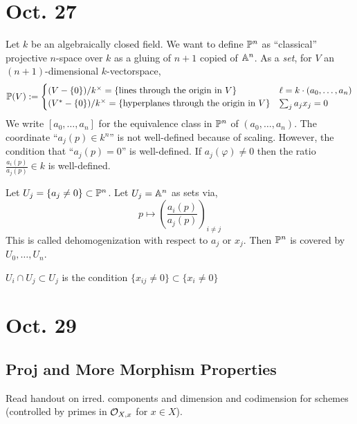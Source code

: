 \documentclass[12pt]{article}
\begin{document}
\section{Oct. 27}

Let $k$ be an algebraically closed field. We want to define $\P^n$ as ``classical'' projective $n$-space over $k$ as a gluing of $n+1$ copied of $\A^n$. As a \textit{set}, for $V$ an $(n+1)$-dimensional $k$-vectorspace,
\[ \P(V) := 
\begin{cases}
(V - \{ 0 \})/k^\times = \{ \text{lines through the origin in } V \} & \ell = k \cdot (a_0, \dots, a_n) 
\\
(V^* - \{ 0 \})/k^\times = \{ \text{hyperplanes through the origin in } V \} & \sum_j a_j x_j = 0 
\end{cases} \]
We write $[a_0, \dots, a_n]$ for the equivalence class in $\P^n$ of $(a_0, \dots, a_n)$. The coordinate ``$a_j(p) \in k^n$'' is not well-defined because of scaling. However, the condition that ``$a_j(p) = 0$'' is well-defined. If $a_j(\varphi) \neq 0$ then the ratio $\frac{a_i(p)}{a_j(p)} \in k$ is well-defined. 

\begin{defn}
Let $U_j = \{ a_j \neq 0 \} \subset \P^n$. Let $U_j = \A^n$ as sets via,
\[ p \mapsto \left( \frac{a_i(p)}{a_j(p)} \right)_{i \neq j} \]
This is called dehomogenization with respect to $a_j$ or $x_j$. Then $\P^n$ is covered by $U_0, \dots, U_n$.
\end{defn}

\begin{rmk}
$U_i \cap U_j \subset U_j$ is the condition $\{ x_{ij} \neq 0 \} \subset \{ x_i \neq 0 \}$
\end{rmk}

\section{Oct. 29}

\subsection{Proj and More Morphism Properties}

\begin{rmk}
Read handout on irred. components and dimension and codimension for schemes (controlled by primes in $\stalk{X}{x}$ for $x \in X$).
\end{rmk}
\end{document}
